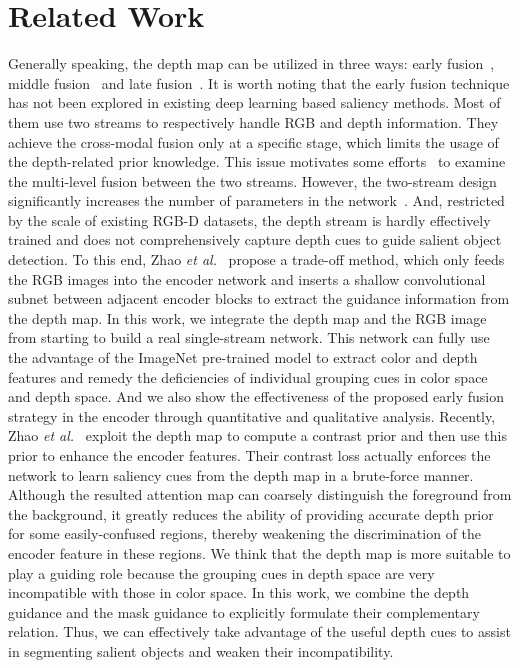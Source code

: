 \documentclass[runningheads]{llncs}
\begin{document}
\section{Related Work}
Generally speaking, the depth map can be utilized in three ways: early fusion~\cite{early_fusion_1,early_fusion_2}, middle fusion~\cite{Middle_fusion} and late fusion~\cite{late_fusion}. It is worth noting that the early fusion technique has not been explored in existing deep learning based saliency methods.  Most of them use two streams to respectively handle RGB and depth information. They achieve the cross-modal fusion only at a specific stage, which limits the usage of the depth-related prior knowledge. This issue motivates some efforts~\cite{PCA,MMCI} to examine the multi-level fusion between the two streams. 
However, the two-stream design significantly increases the number of parameters in the network~\cite{CTMF,PCA,MMCI,AF_RGBD}. And, restricted by the scale of existing RGB-D datasets, the depth stream is hardly effectively trained and does not comprehensively capture depth cues to guide salient object detection. 
To this end, Zhao \textit{et al.}~\cite{CPFP} propose a trade-off method, which only feeds the RGB images into the encoder network and inserts a shallow convolutional subnet between adjacent encoder blocks to extract the guidance information from the depth map. 
In this work, we integrate the depth map and the RGB image from starting to build a real single-stream network. This network can fully use the advantage of the ImageNet pre-trained model to extract color and depth features and remedy the deficiencies of individual grouping cues in color space and depth space. And we also show the effectiveness of the proposed early fusion strategy in the encoder through quantitative and qualitative analysis.
Recently, Zhao \textit{et al.}~\cite{CPFP} exploit the depth map to compute a contrast prior and then use this prior to enhance the encoder features. Their contrast loss actually enforces the network to learn saliency cues from the depth map in a brute-force manner. 
Although the resulted attention map can coarsely distinguish the foreground from the background, it greatly reduces the ability of providing accurate depth prior for some easily-confused regions, thereby weakening the discrimination of the encoder feature in these regions.
We think that the depth map is more suitable to play a guiding role because the grouping cues in depth space are very incompatible with those in color space.
In this work, we combine the depth guidance and the mask guidance to explicitly formulate their complementary relation. Thus, we can effectively take advantage of the useful depth cues to assist in segmenting salient objects and weaken their incompatibility.   
\end{document}
